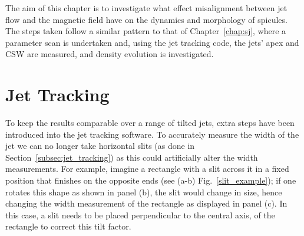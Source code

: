 %
The aim of this chapter is to investigate what effect misalignment between jet flow and the magnetic field have on the dynamics and morphology of spicules. The steps taken follow a similar pattern to that of Chapter~\ref{chap:sj}, where a parameter scan is undertaken and, using the jet tracking code, the jets' apex and CSW are measured, and density evolution is investigated. 
\section{Jet Tracking}
\label{sec:tjt}
To keep the results comparable over a range of tilted jets, extra steps have been introduced into the jet tracking software. To accurately measure the width of the jet we can no longer take horizontal slits (as done in Section~\ref{subsec:jet_tracking}) as this could artificially alter the width measurements. For example, imagine a rectangle with a slit across it in a fixed position that finishes on the opposite ends (see (a-b) Fig.~\ref{slit_example}); if one rotates this shape as shown in panel (b), the slit would change in size, hence changing the width measurement of the rectangle as displayed in panel (c). In this case, a slit needs to be placed perpendicular to the central axis, of the rectangle to correct this tilt factor. \np
%
